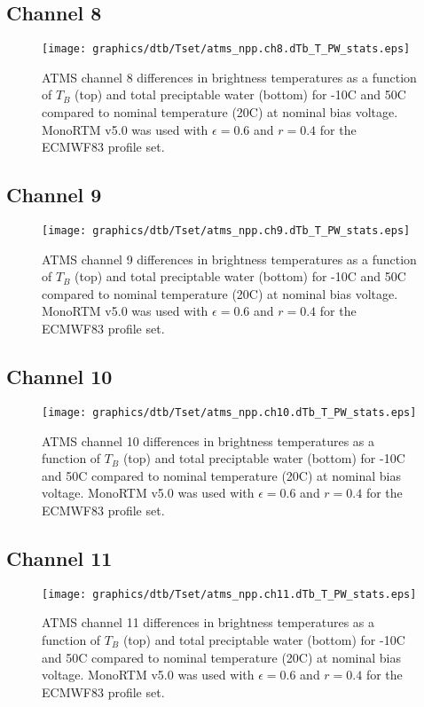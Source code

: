 \subsection{Channel 8}
\begin{figure}[H]
  \label{fig:Tset.ch8_dtb}
  \centering
  \hspace{1.5cm}\texttt{[image: graphics/dtb/Tset/atms\_npp.ch8.dTb\_T\_PW\_stats.eps]}
  \caption{ATMS channel 8 differences in brightness temperatures as a function of $T_B$ (top) and total preciptable water (bottom) for -10\textdegree{}C and 50\textdegree{}C compared to nominal temperature (20\textdegree{}C) at nominal bias voltage. MonoRTM v5.0 was used with $\epsilon=0.6$ and $r=0.4$ for the ECMWF83 profile set.}
\end{figure}

\subsection{Channel 9}
\begin{figure}[H]
  \label{fig:Tset.ch9_dtb}
  \centering
  \hspace{1.5cm}\texttt{[image: graphics/dtb/Tset/atms\_npp.ch9.dTb\_T\_PW\_stats.eps]}
  \caption{ATMS channel 9 differences in brightness temperatures as a function of $T_B$ (top) and total preciptable water (bottom) for -10\textdegree{}C and 50\textdegree{}C compared to nominal temperature (20\textdegree{}C) at nominal bias voltage. MonoRTM v5.0 was used with $\epsilon=0.6$ and $r=0.4$ for the ECMWF83 profile set.}
\end{figure}

\subsection{Channel 10}
\begin{figure}[H]
  \label{fig:Tset.ch10_dtb}
  \centering
  \hspace{1.5cm}\texttt{[image: graphics/dtb/Tset/atms\_npp.ch10.dTb\_T\_PW\_stats.eps]}
  \caption{ATMS channel 10 differences in brightness temperatures as a function of $T_B$ (top) and total preciptable water (bottom) for -10\textdegree{}C and 50\textdegree{}C compared to nominal temperature (20\textdegree{}C) at nominal bias voltage. MonoRTM v5.0 was used with $\epsilon=0.6$ and $r=0.4$ for the ECMWF83 profile set.}
\end{figure}

\subsection{Channel 11}
\begin{figure}[H]
  \label{fig:Tset.ch11_dtb}
  \centering
  \hspace{1.5cm}\texttt{[image: graphics/dtb/Tset/atms\_npp.ch11.dTb\_T\_PW\_stats.eps]}
  \caption{ATMS channel 11 differences in brightness temperatures as a function of $T_B$ (top) and total preciptable water (bottom) for -10\textdegree{}C and 50\textdegree{}C compared to nominal temperature (20\textdegree{}C) at nominal bias voltage. MonoRTM v5.0 was used with $\epsilon=0.6$ and $r=0.4$ for the ECMWF83 profile set.}
\end{figure}


